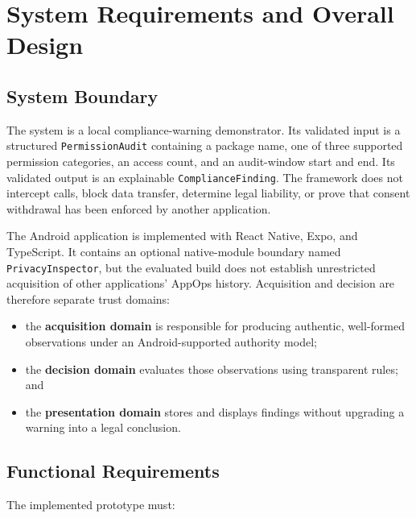 \newpage
\section{System Requirements and Overall Design}

\subsection{System Boundary}

The system is a local compliance-warning demonstrator. Its validated input is a structured \texttt{PermissionAudit} containing a package name, one of three supported permission categories, an access count, and an audit-window start and end. Its validated output is an explainable \texttt{ComplianceFinding}. The framework does not intercept calls, block data transfer, determine legal liability, or prove that consent withdrawal has been enforced by another application.

The Android application is implemented with React Native, Expo, and TypeScript. It contains an optional native-module boundary named \texttt{PrivacyInspector}, but the evaluated build does not establish unrestricted acquisition of other applications' AppOps history. Acquisition and decision are therefore separate trust domains:

\begin{itemize}
    \item the \textbf{acquisition domain} is responsible for producing authentic, well-formed observations under an Android-supported authority model;
    \item the \textbf{decision domain} evaluates those observations using transparent rules; and
    \item the \textbf{presentation domain} stores and displays findings without upgrading a warning into a legal conclusion.
\end{itemize}

\subsection{Functional Requirements}

The implemented prototype must:

